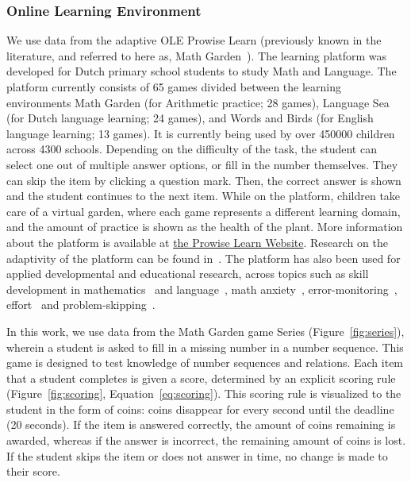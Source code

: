 \documentclass[manuscript]{acmart}
\begin{document}
\subsubsection{Online Learning Environment}
We use data from the adaptive OLE Prowise Learn (previously known in the literature, and referred to here as, Math Garden~\cite{klinkenberg2011computer}). The learning platform was developed for Dutch primary school students to study Math and Language. The platform currently consists of 65 games divided between the learning environments Math Garden (for Arithmetic practice; 28 games), Language Sea (for Dutch language learning; 24 games), and Words and Birds (for English language learning; 13 games). It is currently being used by over \num{450000} children across \num{4300} schools. Depending on the difficulty of the task, the student can select one out of multiple answer options, or fill in the number themselves. They can skip the item by clicking a question mark. Then, the correct answer is shown and the student continues to the next item. While on the platform, children take care of a virtual garden, where each game represents a different learning domain, and the amount of practice is shown as the health of the plant. More information about the platform is available at \href{https://www.prowise.com/en/product/prowise-learn/}{the Prowise Learn Website}. Research on the adaptivity of the platform can be found in~\cite{klinkenberg2011computer, brinkhuis2018learning, brinkhuis2020governing, hofman2018solution}. The platform has also been used for applied developmental and educational research, across topics such as skill development in mathematics~\cite{ou2019modeling} and language~\cite{kievit2019mutualistic}, math anxiety~\cite{jansen2013influence, jansen2016affective, hilz2023relationship}, error-monitoring~\cite{de2022post, de2021error}, effort~\cite{savi2023combating} and problem-skipping~\cite{savi2018delaying}. 

In this work, we use data from the Math Garden game Series (Figure~\ref{fig:series}), wherein a student is asked to fill in a missing number in a number sequence. This game is designed to test knowledge of number sequences and relations. Each item that a student completes is given a score, determined by an explicit scoring rule (Figure~\ref{fig:scoring}, Equation~\ref{eq:scoring}). This scoring rule is visualized to the student in the form of coins: coins disappear for every second until the deadline (20 seconds). If the item is answered correctly, the amount of coins remaining is awarded, whereas if the answer is incorrect, the remaining amount of coins is lost. If the student skips the item or does not answer in time, no change is made to their score. 
\end{document}
